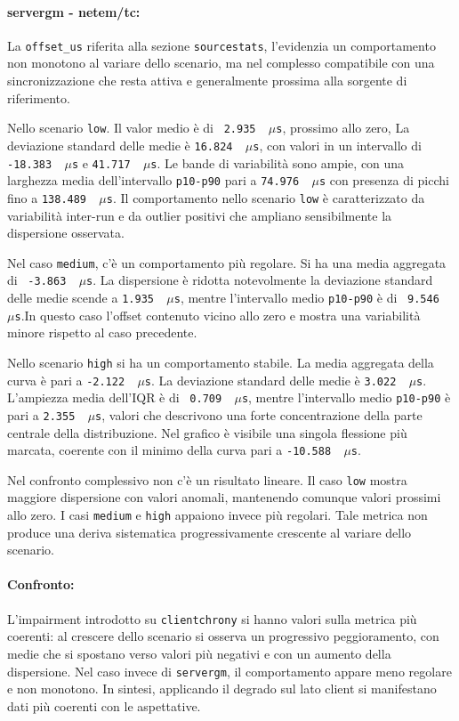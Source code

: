 \paragraph*{servergm - netem/tc:}
La \texttt{offset\_us} riferita alla sezione \texttt{sourcestats}, l'evidenzia
un comportamento non monotono al variare dello scenario, ma nel complesso compatibile
con una sincronizzazione che resta attiva e generalmente prossima alla sorgente di
riferimento.

Nello scenario \texttt{low}. Il valor medio è di ~\texttt{2.935 \,$\mu$s},
prossimo allo zero, La deviazione standard delle medie è \texttt{16.824 \,$\mu$s},
con valori in un intervallo di \texttt{-18.383 \,$\mu$s} e \texttt{41.717 \,$\mu$s}.
Le bande di variabilità sono ampie, con una larghezza media dell'intervallo \texttt{p10-p90}
pari a \texttt{74.976 \,$\mu$s} con presenza di picchi fino a \texttt{138.489 \,$\mu$s}.
Il comportamento nello scenario \texttt{low} è caratterizzato da variabilità
inter-run e da outlier positivi che ampliano sensibilmente la dispersione
osservata.

Nel caso \texttt{medium}, c'è un comportamento più regolare. Si ha una media aggregata
di ~\texttt{-3.863 \,$\mu$s}. La dispersione è ridotta notevolmente la deviazione
standard delle medie scende a \texttt{1.935 \,$\mu$s}, mentre l'intervallo medio
\texttt{p10-p90} è di ~\texttt{9.546 \,$\mu$s}.In questo caso l'offset contenuto vicino
allo zero e mostra una variabilità minore rispetto al caso precedente.

Nello scenario \texttt{high} si ha un comportamento stabile. La media aggregata della
curva è pari a \texttt{-2.122 \,$\mu$s}. La deviazione standard delle medie è \texttt{3.022
\,$\mu$s}. L'ampiezza media dell'IQR è di ~\texttt{0.709 \,$\mu$s}, mentre l'intervallo
medio \texttt{p10-p90} è pari a \texttt{2.355 \,$\mu$s}, valori che descrivono una
forte concentrazione della parte centrale della distribuzione. Nel grafico è
visibile una singola flessione più marcata, coerente con il minimo della curva pari
a \texttt{-10.588 \,$\mu$s}.

Nel confronto complessivo non c'è un risultato lineare. Il caso \texttt{low}
mostra maggiore dispersione con valori anomali, mantenendo comunque valori prossimi
allo zero. I casi \texttt{medium} e \texttt{high} appaiono invece più regolari. Tale
metrica non produce una deriva sistematica progressivamente crescente al variare dello
scenario.

\paragraph*{Confronto:}
L'impairment introdotto su \texttt{clientchrony} si hanno valori sulla metrica più
coerenti: al crescere dello scenario si osserva un progressivo peggioramento, con
medie che si spostano verso valori più negativi e con un aumento della dispersione. Nel
caso invece di \texttt{servergm}, il comportamento appare meno regolare e non monotono.
In sintesi, applicando il degrado sul lato client si manifestano dati più coerenti
con le aspettative.

